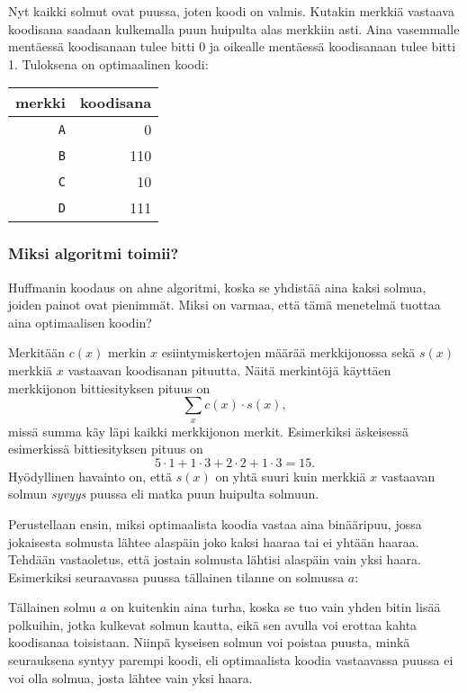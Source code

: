 Nyt kaikki solmut ovat puussa, joten koodi on valmis.
Kutakin merkkiä vastaava koodisana saadaan
kulkemalla puun huipulta alas merkkiin asti.
Aina vasemmalle mentäessä koodisanaan tulee bitti 0
ja oikealle mentäessä koodisanaan tulee bitti 1.
Tuloksena on optimaalinen koodi:
\begin{center}
\begin{tabular}{rr}
merkki & koodisana \\
\hline
\texttt{A} & 0 \\
\texttt{B} & 110 \\
\texttt{C} & 10 \\
\texttt{D} & 111 \\
\end{tabular}
\end{center}

\subsubsection{Miksi algoritmi toimii?}

Huffmanin koodaus on ahne algoritmi, koska se
yhdistää aina kaksi solmua, joiden painot ovat
pienimmät.
Miksi on varmaa, että tämä menetelmä tuottaa
aina optimaalisen koodin?

Merkitään $c(x)$ merkin $x$ esiintymiskertojen
määrää merkkijonossa sekä $s(x)$
merkkiä $x$ vastaavan koodisanan pituutta.
Näitä merkintöjä käyttäen merkkijonon
bittiesityksen pituus on
\[\sum_x c(x) \cdot s(x),\]
missä summa käy läpi kaikki merkkijonon merkit.
Esimerkiksi äskeisessä esimerkissä
bittiesityksen pituus on
\[5 \cdot 1 + 1 \cdot 3 + 2 \cdot 2 + 1 \cdot 3 = 15.\]
Hyödyllinen havainto on, että $s(x)$ on yhtä suuri kuin
merkkiä $x$ vastaavan solmun \emph{syvyys} puussa
eli matka puun huipulta solmuun.

Perustellaan ensin, miksi optimaalista koodia vastaa
aina binääripuu, jossa jokaisesta solmusta lähtee
alaspäin joko kaksi haaraa tai ei yhtään haaraa.
Tehdään vastaoletus, että jostain solmusta lähtisi
alaspäin vain yksi haara.
Esimerkiksi seuraavassa puussa tällainen tilanne on solmussa $a$:
\begin{center}
\end{center}
Tällainen solmu $a$ on kuitenkin aina turha, koska se
tuo vain yhden bitin lisää polkuihin, jotka kulkevat
solmun kautta, eikä sen avulla voi erottaa kahta
koodisanaa toisistaan. Niinpä kyseisen solmun voi poistaa
puusta, minkä seurauksena syntyy parempi koodi,
eli optimaalista koodia vastaavassa puussa ei voi olla
solmua, josta lähtee vain yksi haara.

